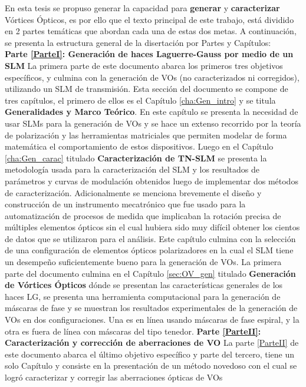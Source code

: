 En esta tesis se propuso generar la capacidad para \textbf{generar} y
\textbf{caracterizar} Vórtices Ópticos, es por ello que el texto
principal de este trabajo, está dividido en 2 partes temáticas
que abordan cada una de estas dos metas.  A continuación, se presenta
la estructura general 
de la disertación por Partes y Capítulos: \\ 
\textbf{Parte \ref{ParteI}: Generación de haces Laguerre-Gauss por medio de un SLM}
La primera parte de este documento abarca los primeros tres objetivos
específicos, y culmina con la generación de VOs (no caracterizados ni
corregidos), utilizando un SLM de transmisión. Esta sección del
documento se compone de tres capítulos, el primero de ellos es el
Capítulo \ref{cha:Gen_intro} y se titula \textbf{Generalidades y Marco
  Teórico}. En este capítulo se presenta la necesidad de usar SLMs
para la generación de VOs y se hace un extenso recorrido por la teoría
de polarización y las herramientas matriciales que permiten modelar de
forma matemática el comportamiento de estos dispositivos. Luego en el
Capítulo \ref{cha:Gen_carac} titulado \textbf{Caracterización de
  TN-SLM} se presenta la metodología usada para la caracterización del
SLM y los resultados de parámetros y curvas de modulación obtenidos
luego de implementar dos métodos de caracterización. Adicionalmente se
menciona brevemente el diseño y construcción de un instrumento
mecatrónico que fue usado para la automatización de procesos de
medida que implicaban la rotación precisa de múltiples elementos
ópticos sin el cual hubiera sido muy difícil obtener los cientos de
datos que se utilizaron para el análisis. Este capítulo
culmina con la selección de una configuración de elementos ópticos
polarizadores en la cual el SLM tiene un desempeño suficientemente
bueno para la generación de VOs. La primera parte del documento culmina  en el Capítulo \ref{sec:OV_gen} titulado \textbf{Generación de Vórtices Ópticos}
dónde se presentan las características generales de los haces LG, se
presenta una herramienta computacional para la generación de máscaras
de fase y se muestran los resultados experimentales de la generación
de VOs en dos configuraciones. Una es en línea usando máscaras de fase
espiral, y la otra es fuera de línea con máscaras del tipo tenedor. 
\textbf{Parte \ref{ParteII}: Caracterización y corrección de aberraciones de VO}
La parte \ref{ParteII} de este documento abarca el último objetivo específico y
parte del tercero, tiene un solo Capítulo y consiste en la presentación de un
método novedoso con el 
cual se logró caracterizar y corregir las aberraciones ópticas de VOs
